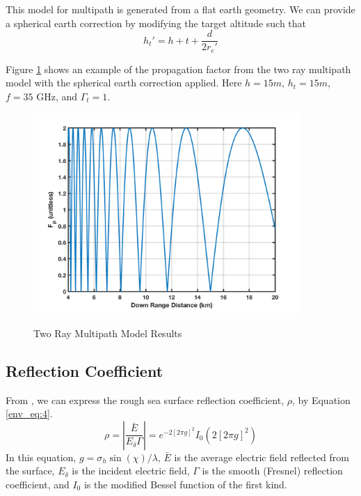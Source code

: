 This model for multipath is generated from a flat earth geometry. We can provide a spherical earth correction by modifying the target altitude \cite{blake_radar} such that
\begin{equation}
  \label{env_eq:3r}
h_t' = h+t + \frac{d}{2r_e'}
\end{equation}

Figure \ref{env_fig:3t} shows an example of the propagation factor from the two ray multipath model with the spherical earth correction applied. Here $h = 15m$, $h_t = 15m$, $f = 35$ GHz, and $\Gamma_t = 1$. 
\begin{figure}[H]
  \begin{center}
\includegraphics[width=4in]{../media/multistatic/two_ray_multipath_results.png}
  \end{center}
  \renewcommand{\baselinestretch}{1} \small\normalsize
  \begin{quote}
    \caption[Two Ray Multipath Model Results]{Two Ray Multipath Model Results\label{env_fig:3t}}
  \end{quote}
\end{figure}
\renewcommand{\baselinestretch}{2} \small\normalsize



\subsection{Reflection Coefficient}
From \cite{miller_reflection}, we can express the rough sea surface reflection coefficient, $\rho$, by Equation \ref{env_eq:4}. 
  \begin{equation}
  \label{env_eq:4}
\rho = \left|\frac{\bar{E}}{E_\delta \Gamma} \right| = e^{-2\left[2\pi g \right]^2}I_0\left( 2\left[2\pi g \right]^2\right) 
\end{equation}
In this equation, $g = \sigma_h\sin(\chi)/\lambda$, $\bar{E}$ is the average electric field reflected from the surface, $E_\delta$ is the incident electric field, $\Gamma$ is the smooth (Fresnel) reflection coefficient, and $I_0$ is the modified Bessel function of the first kind.

